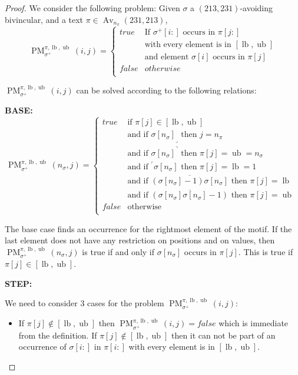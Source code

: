 \documentclass[a4paper]{llncs}
\DeclareMathOperator{\Avd}{Av}
\newcommand\Av[2]{\Avd_{{#1}}({#2})}
\newcommand{\ptext}{\pi}
\newcommand{\pmotif}{\sigma}
\newcommand{\pbmotif}{\pmotif^+}
\DeclareMathOperator{\PMa}{PM}
\newcommand{\PM}[6]{\PMa_{{#1}}^{{#2},{#3},{#4}}({#5},{#6})}
\DeclareMathOperator{\lb}{lb}
\DeclareMathOperator{\ub}{ub}
\begin{document}
\begin{proof}
We consider the following problem:
Given $\pmotif$ a $(213,231)$-avoiding bivincular, and a 
text $\ptext \in \Av{n_\ptext}{231,213}$,
$$
\PM{\pbmotif}{\ptext}{\lb}{\ub}{i}{j}=
\begin{cases}
	true 	& \text{If $\pbmotif[i:]$ occurs in $\ptext[j:]$}\\
			& \text{with every element is in $[\lb,\ub]$}\\
			& \text{and element $\pmotif[i]$ occurs in $\ptext[j]$ }\\
	false 	& otherwise\\
\end{cases}
$$

$\PM{\pbmotif}{\ptext}{\lb}{\ub}{i}{j}$ can be solved according to  
the following relations:

\noindent\textbf{BASE:} \\
$$
\PM{\pbmotif}{\ptext}{\lb}{\ub}{n_\pmotif}{j}=
\begin{cases}
	true 	& \text{if $\ptext[j] \in [\lb,\ub ]$}\\
			& \text{and if ${\pmotif[n_\pmotif]}_\lrcorner$ then $j=n_\ptext$}\\
			& \text{and if ${\pmotif[n_\pmotif]}^\urcorner$ then $\ptext[j]=\ub=n_\pmotif$}\\
			& \text{and if  $^\ulcorner{\pmotif[n_\pmotif]}$ then $\ptext[j]=\lb=1$ } \\
			& \text{and if  $\overline{(\pmotif[n_\pmotif]-1)\pmotif[n_\pmotif] }$ then $\ptext[j]=\lb$ }  \\
			& \text{and if  $\overline{(\pmotif[n_\pmotif]\pmotif[n_\pmotif]-1)}$ then $\ptext[j]=\ub$}  \\

	false	& \text{otherwise} \\
\end{cases}
$$

The base case finds an occurrence for the rightmost element of the motif. 
If the last element does not have any restriction on positions and on values, 
then $\PM{\pbmotif}{\ptext}{\lb}{\ub}{n_\pmotif}{j}$ is true if and only if 
$\pmotif[n_\pmotif]$ occurs in $\ptext[j]$. 
This is true if $\ptext[j] \in [\lb,\ub]$. 

\noindent\textbf{STEP:} 

We need to consider $3$ cases for the problem $\PM{\pbmotif}{\ptext}{\lb}{\ub}{i}{j}$:
\begin{itemize}
	\item If $\ptext[j] \notin [\lb,\ub]$ then
	$
	\PM{\pbmotif}{\ptext}{\lb}{\ub}{i}{j} = false
	$
	which is immediate from the definition. 
	If $\ptext[j] \notin [\lb,\ub]$ then it can not be part of an 
	occurrence of  $\pmotif[i:]$ in $\ptext[i:]$ with every element is 
	in $[\lb,\ub]$.
	

\end{itemize}
\end{proof}
\end{document}
